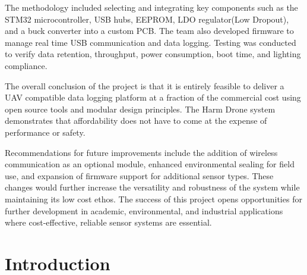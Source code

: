 \documentclass[12pt]{article}
\begin{document}
\par The methodology included selecting and integrating key components such as the STM32 microcontroller, USB hubs, EEPROM, LDO regulator(Low Dropout), and a buck converter into a custom PCB. The team also developed firmware to manage real time USB communication and data logging. Testing was conducted to verify data retention, throughput, power consumption, boot time, and lighting compliance. 

\par The overall conclusion of the project is that it is entirely feasible to deliver a UAV compatible data logging platform at a fraction of the commercial cost using open source tools and modular design principles. The Harm Drone system demonstrates that affordability does not have to come at the expense of performance or safety.

\par Recommendations for future improvements include the addition of wireless communication as an optional module, enhanced environmental sealing for field use, and expansion of firmware support for additional sensor types. These changes would further increase the versatility and robustness of the system while maintaining its low cost ethos. The success of this project opens opportunities for further development in academic, environmental, and industrial applications where cost-effective, reliable sensor systems are essential.

\newpage
\tableofcontents
\listoffigures
\listoftables
\newpage

\section{Introduction}
\end{document}
